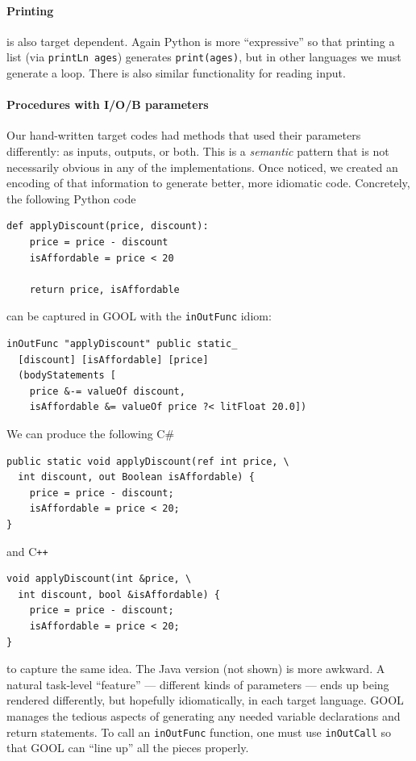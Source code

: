 \documentclass[sigplan,screen,10pt]{acmart}
\newcommand{\Csharp}{C\#}
\newcommand{\Cplusplus}{C\texttt{++}}
\begin{document}
\paragraph{Printing}
is also target dependent.  Again Python
is more ``expressive'' so that printing a list (via
\verb|printLn ages|) generates \verb|print(ages)|, but in other languages
we must generate a loop. 
There is also similar functionality for reading input.

\paragraph{Procedures with I/O/B parameters}
Our hand-written target codes had methods that
used their parameters differently: as inputs, outputs, or both.
This is a \emph{semantic} pattern that is
not necessarily obvious in any of the implementations. Once noticed,
we created an encoding of that information to generate better,
more idiomatic code.  Concretely, the following Python code
\begin{lstlisting}
def applyDiscount(price, discount):
    price = price - discount
    isAffordable = price < 20

    return price, isAffordable
\end{lstlisting}
can be captured in GOOL with the \verb|inOutFunc| idiom:
\begin{lstlisting}
inOutFunc "applyDiscount" public static_
  [discount] [isAffordable] [price]
  (bodyStatements [
    price &-= valueOf discount,
    isAffordable &= valueOf price ?< litFloat 20.0])
\end{lstlisting}
We can produce the following \Csharp
\begin{lstlisting}
public static void applyDiscount(ref int price, \
  int discount, out Boolean isAffordable) {
    price = price - discount;
    isAffordable = price < 20;
}
\end{lstlisting}
and \Cplusplus
\begin{lstlisting}
void applyDiscount(int &price, \
  int discount, bool &isAffordable) {
    price = price - discount;
    isAffordable = price < 20;
}
\end{lstlisting}
to capture the same idea.  The Java version (not shown) is more
awkward.
A natural task-level ``feature'' --- 
different kinds of parameters --- ends up being rendered differently,
but hopefully idiomatically, in each target language.  GOOL manages the
tedious aspects of generating any needed variable declarations and return
statements.  To call an \verb|inOutFunc| function, one must use
\verb|inOutCall| so that GOOL can ``line up'' all the pieces properly.
\end{document}
